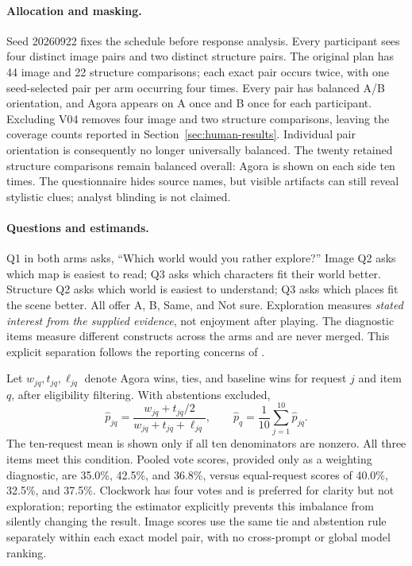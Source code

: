 \paragraph{Allocation and masking.}
Seed 20260922 fixes the schedule before response analysis. Every participant
sees four distinct image pairs and two distinct structure pairs. The original
plan has 44 image and 22 structure comparisons; each exact pair occurs twice,
with one seed-selected pair per arm occurring four times. Every pair has
balanced A/B orientation, and Agora appears on A once and B once for each
participant. Excluding V04 removes four image and two structure comparisons,
leaving the coverage counts reported in Section~\ref{sec:human-results}.
Individual pair orientation is consequently no longer universally balanced.
The twenty retained structure comparisons remain balanced overall: Agora is
shown on each side ten times. The questionnaire hides source names, but
visible artifacts can still reveal stylistic clues; analyst blinding is
not claimed.

\paragraph{Questions and estimands.}
Q1 in both arms asks, ``Which world would you rather explore?'' Image Q2 asks
which map is easiest to read; Q3 asks which characters fit their world better.
Structure Q2 asks which world is easiest to understand; Q3 asks which places
fit the scene better. All offer A, B, Same, and Not sure. Exploration measures
\emph{stated interest from the supplied evidence}, not enjoyment after playing.
The diagnostic items measure different constructs across the arms and are
never merged. This explicit separation follows the reporting concerns of
\citet{howcroft}.

Let $w_{jq},t_{jq},\ell_{jq}$ denote Agora wins, ties, and baseline wins for
request $j$ and item $q$, after eligibility filtering. With abstentions excluded,
\begin{equation}
\hat p_{jq}=\frac{w_{jq}+t_{jq}/2}{w_{jq}+t_{jq}+\ell_{jq}},
\qquad \hat p_q=\frac{1}{10}\sum_{j=1}^{10}\hat p_{jq}.
\end{equation}
The ten-request mean is shown only if all ten denominators are nonzero. All
three items meet this condition. Pooled vote scores, provided only as a
weighting diagnostic, are 35.0\%, 42.5\%, and 36.8\%, versus equal-request
scores of 40.0\%, 32.5\%, and 37.5\%. Clockwork has four votes and is preferred
for clarity but not exploration; reporting the estimator explicitly prevents
this imbalance from silently changing the result. Image scores use the same
tie and abstention rule separately within each exact model pair, with no
cross-prompt or global model ranking.

